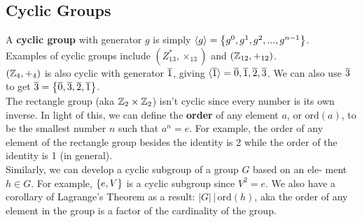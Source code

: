 \subsection{Cyclic Groups}
A \textbf{cyclic group} with generator $g$ is simply 
$\langle g \rangle = \left\{g^0, g^1, g^2, . . . , g^{n-1}\right\}$. \\

Examples of cyclic groups include $(Z^*_{13}, \times_{13})$ and $(\mathbb{Z}_{12}, +_{12})$. \\

$(\mathbb{Z}_4, +_4)$ is also cyclic with generator $\overline{1}$, giving $\langle \overline{1} \rangle = {\overline{0}, \overline{1}, \overline{2}, \overline{3}}$. We can also
use $\overline{3}$ to get $\overline{3} = \left\{\overline{0}, \overline{3}, \overline{2}, \overline{1}\right\}$. \\

The rectangle group (aka $\mathbb{Z}_2 \times \mathbb{Z}_2$) isn't cyclic since every number is its own
inverse. In light of this, we can deﬁne the \textbf{order} of any element $a$, or $\mathrm{ord}(a)$,
to be the smallest number $n$ such that $a^n = e$. For example, the order of any
element of the rectangle group besides the identity is 2 while the order of
the identity is 1 (in general).\\

Similarly, we can develop a cyclic subgroup of a group $G$ based on an ele-
ment $h \in G$. For example, $\left\{e, V\right\}$ is a cyclic subgroup since $V^2 = e$.
We also have a corollary of Lagrange's Theorem as a result: $|G| \, | \, \mathrm{ord}(h)$,
aka the order of any element in the group is a factor of the cardinality of the
group.
